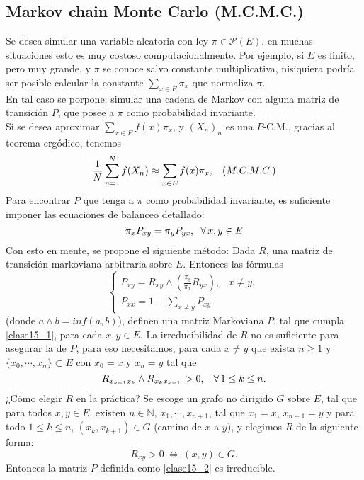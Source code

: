 \documentclass[a4paper]{article}
\numberwithin{equation}{subsection}
\def\N{\mathbb N}
\begin{document}
\subsection{Markov chain Monte Carlo (M.C.M.C.)}
Se desea simular una variable aleatoria con ley $\pi \in \mathcal{P}(E)$, en muchas situaciones esto es muy costoso computacionalmente. Por ejemplo, si $E$ es finito, pero muy grande, y $\pi$ se conoce salvo constante multiplicativa, nisiquiera podría ser posible calcular la constante $\sum_{x\in E}\pi_x$ que normaliza $\pi$.\\ \newline
En tal caso se porpone: simular una cadena de Markov con alguna matriz de transición $P$, que posee a $\pi$ como probabilidad invariante.\\ \newline
Si se desea aproximar $\sum_{x\in E} f(x)\pi_x$, y $(X_n)_n$ es una $P$-C.M., gracias al teorema ergódico, tenemos
\[\frac{1}{N} \sum_{n=1}^N f(X_n) \approx \sum_{x\in E}f(x)\pi_x,\hspace{0.3cm}(M.C.M.C.)\]
Para encontrar $P$ que tenga a $\pi$ como probabilidad invariante, es suficiente imponer las ecuaciones de balanceo detallado:
\begin{equation}
    \pi_x P_{xy} = \pi_y P_{yx},\hspace{0.2cm}\forall\,x,y\in E
    \label{clase15_1}
\end{equation}
Con esto en mente, se propone el siguiente método: Dada $R$, una matriz de transición markoviana arbitraria sobre $E$. Entonces las fórmulas
\begin{equation}
    \begin{cases}
        P_{xy} = R_{xy}\wedge \left(\frac{\pi_y}{\pi_x}R_{yx}\right), & x \neq y,\\
        P_{xx} = 1-\sum_{x\neq y}P_{xy}
    \end{cases}
    \label{clase15_2}
\end{equation}
(donde $a\wedge b = inf(a,b)$), definen una matriz Markoviana $P$, tal que cumpla \ref{clase15_1}, para cada $x,y\in E$. La irreducibilidad de $R$ no es suficiente para asegurar la de $P$, para eso necesitamos, para cada $x\neq y$ que exista $n\geq 1$ y $\{x_0,\cdots,x_n\} \subset E$ con $x_0 = x$ y $x_n=y$ tal que
\[R_{x_{k-1}x_k}\wedge R_{x_kx_{k-1}}\,>0,\hspace{0.3cm}\forall\,1\leq k\leq n.\]
¿Cómo elegir $R$ en la práctica? Se escoge un grafo no dirigido $G$ sobre $E$, tal que para todos $x,y\in E$, existen $n\in \N$, $x_1,\cdots,x_{n+1}$, tal que $x_1=x$, $x_{n+1}=y$ y para todo $1\leq k\leq n$, $(x_k,x_{k+1})\in G$ (camino de $x$ a $y$), y elegimos $R$ de la siguiente forma:
\[R_{xy} >0\,\Longleftrightarrow\,(x,y)\in G.\]
Entonces la matriz $P$ definida como \ref{clase15_2} es irreducible.\\ \newline
\end{document}
